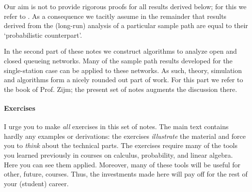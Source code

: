 Our aim is not to provide rigorous proofs for all results derived below; for this we refer to
\cite{el-taha98:_sampl_path_analy_queuein_system}. As a consequence we tacitly
assume in the remainder that results derived from the (long-run)
analysis of a particular sample path are equal to their `probabilistic
counterpart'. 

In the second part of these notes we construct algorithms to analyze open and closed
queueing networks. Many of the sample path results developed for the
single-station case can be applied to these networks. As such, theory,
simulation and algorithms form a nicely rounded out part of work.  For
this part we refer to the book of Prof. Zijm; the present set of notes
augments the discussion there.


\paragraph{Exercises}

I urge you to make \emph{all} exercises in this set of notes.
The main text contains hardly any examples or derivations: the exercises \emph{illustrate} the material and force you to \textit{think} about the technical parts.
The exercises require many of the tools you learned previously in courses on calculus, probability, and linear algebra.
Here you can see them applied.
Moreover, many of these tools will be useful for other, future, courses.
Thus, the investments made here will pay off for the rest of your (student) career.


